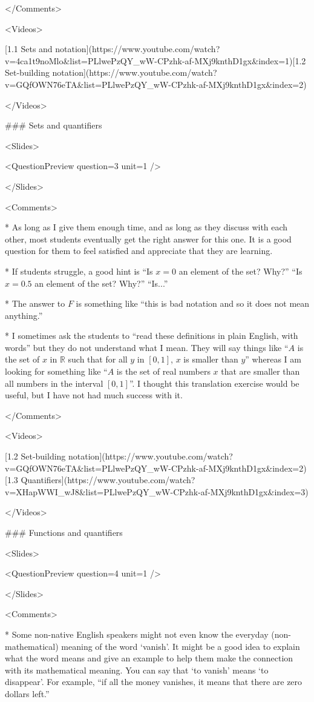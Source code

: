 </Comments>

<Videos>

[1.1 Sets and notation](https://www.youtube.com/watch?v=4ca1t9noMlo\&list=PLlwePzQY_wW-CPzhk-af-MXj9knthD1gx\&index=1)[1.2 Set-building notation](https://www.youtube.com/watch?v=GQfOWN76eTA\&list=PLlwePzQY_wW-CPzhk-af-MXj9knthD1gx\&index=2)

</Videos>

### Sets and quantifiers

<Slides>

<QuestionPreview question={3} unit={1} />

</Slides>

<Comments>

*   As long as I give them enough time, and as long as they discuss with each other, most students eventually get the right answer for this one. It is a good question for them to feel satisfied and appreciate that they are learning.

*   If students struggle, a good hint is “Is $x=0$ an element of the set? Why?” “Is $x=0.5$ an element of the set? Why?” “Is...”

*   The answer to $F$ is something like “this is bad notation and so it does not mean anything.”

*   I sometimes ask the students to “read these definitions in plain English, with words” but they do not understand what I mean. They will say things like “$A$ is the set of $x$ in $\mathbb{R}$ such that for all $y$ in $[0,1]$, $x$ is smaller than $y$” whereas I am looking for something like “$A$ is the set of real numbers $x$ that are smaller than all numbers in the interval $[0,1]$”. I thought this translation exercise would be useful, but I have not had much success with it.

</Comments>

<Videos>

[1.2 Set-building notation](https://www.youtube.com/watch?v=GQfOWN76eTA\&list=PLlwePzQY_wW-CPzhk-af-MXj9knthD1gx\&index=2)[1.3 Quantifiers](https://www.youtube.com/watch?v=XHapWWI_wJ8\&list=PLlwePzQY_wW-CPzhk-af-MXj9knthD1gx\&index=3)

</Videos>

### Functions and quantifiers

<Slides>

<QuestionPreview question={4} unit={1} />

</Slides>

<Comments>

*   Some non-native English speakers might not even know the everyday (non-mathematical) meaning of the word ‘vanish’. It might be a good idea to explain what the word means and give an example to help them make the connection with its mathematical meaning. You can say that ‘to vanish’ means ‘to disappear’. For example, “if all the money vanishes, it means that there are zero dollars left.”

